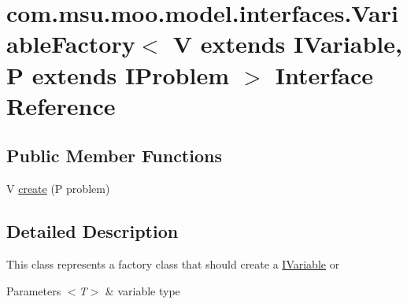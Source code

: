 \hypertarget{interfacecom_1_1msu_1_1moo_1_1model_1_1interfaces_1_1VariableFactory_3_01V_01extends_01IVariablebc6c2f25a98dd397b069d7e08412a00f}{\section{com.\-msu.\-moo.\-model.\-interfaces.\-Variable\-Factory$<$ V extends I\-Variable, P extends I\-Problem $>$ Interface Reference}
\label{interfacecom_1_1msu_1_1moo_1_1model_1_1interfaces_1_1VariableFactory_3_01V_01extends_01IVariablebc6c2f25a98dd397b069d7e08412a00f}
}
\subsection*{Public Member Functions}
\begin{DoxyCompactItemize}
\item 
V \hyperlink{interfacecom_1_1msu_1_1moo_1_1model_1_1interfaces_1_1VariableFactory_3_01V_01extends_01IVariablebc6c2f25a98dd397b069d7e08412a00f_a656e295c0f79eb4ace5d1f21925a2bce}{create} (P problem)
\end{DoxyCompactItemize}


\subsection{Detailed Description}
This class represents a factory class that should create a \hyperlink{interfacecom_1_1msu_1_1moo_1_1model_1_1interfaces_1_1IVariable}{I\-Variable} or


\begin{DoxyParams}{Parameters}
{\em $<$\-T$>$} & variable type \\
\hline
\end{DoxyParams}


